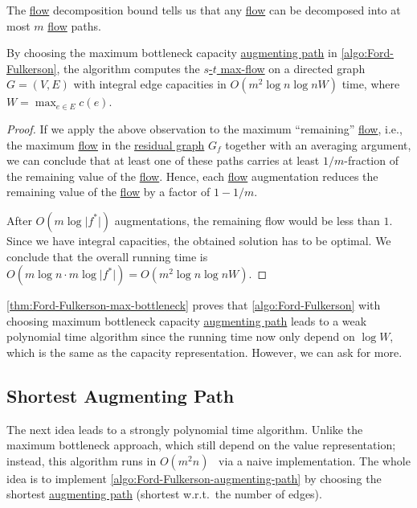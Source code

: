 \begin{prev}
	The \hyperref[def:flow]{flow} decomposition bound tells us that any \hyperref[def:flow]{flow} can be decomposed into at most \(m\) \hyperref[def:flow]{flow} paths.
\end{prev}

\begin{theorem}\label{thm:Ford-Fulkerson-max-bottleneck}
	By choosing the maximum bottleneck capacity \hyperref[def:augmenting-path]{augmenting path} in \autoref{algo:Ford-Fulkerson}, the algorithm computes the \hyperref[prb:s-t-max-flow]{\(s\)-\(t\) max-flow} on a directed graph \(G = (V, E)\) with integral edge capacities in \(O(m^2 \log n \log nW)\) time, where \(W = \max _{e \in E} c(e)\).
\end{theorem}
\begin{proof}
	If we apply the above observation to the maximum ``remaining'' \hyperref[def:flow]{flow}, i.e., the maximum \hyperref[def:flow]{flow} in the \hyperref[def:residual-graph]{residual graph} \(G_f\) together with an averaging argument, we can conclude that at least one of these paths carries at least \(1 / m\)-fraction of the remaining value of the \hyperref[def:flow]{flow}. Hence, each \hyperref[def:flow]{flow} augmentation reduces the remaining value of the \hyperref[def:flow]{flow} by a factor of \(1 - 1 / m\).

	After \(O(m \log \lvert f^{\ast} \rvert )\) augmentations, the remaining flow would be less than \(1\). Since we have integral capacities, the obtained solution has to be optimal. We conclude that the overall running time is \(O(m \log n \cdot m \log \lvert f^{\ast} \rvert ) = O(m^2 \log n \log nW)\).
\end{proof}

\autoref{thm:Ford-Fulkerson-max-bottleneck} proves that \autoref{algo:Ford-Fulkerson} with choosing maximum bottleneck capacity \hyperref[def:augmenting-path]{augmenting path} leads to a weak polynomial time algorithm since the running time now only depend on \(\log W\), which is the same as the capacity representation. However, we can ask for more.

\subsection{Shortest Augmenting Path}
The next idea leads to a strongly polynomial time algorithm. Unlike the maximum bottleneck approach, which still depend on the value representation; instead, this algorithm runs in \(O(m^2 n)\)~\cite{edmonds1972theoretical} via a naive implementation. The whole idea is to implement \autoref{algo:Ford-Fulkerson-augmenting-path} by choosing the shortest \hyperref[def:augmenting-path]{augmenting path} (shortest w.r.t.\ the number of edges).

